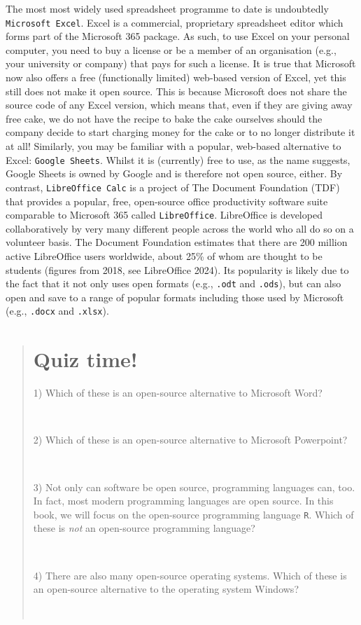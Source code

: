 \documentclass[
  letterpaper,
  DIV=11,
  numbers=noendperiod]{scrreprt}
\begin{document}
The most most widely used spreadsheet programme to date is undoubtedly
\texttt{Microsoft\ Excel}. Excel is a commercial, proprietary
spreadsheet editor which forms part of the Microsoft 365 package. As
such, to use Excel on your personal computer, you need to buy a license
or be a member of an organisation (e.g., your university or company)
that pays for such a license. It is true that Microsoft now also offers
a free (functionally limited) web-based version of Excel, yet this still
does not make it open source. This is because Microsoft does not share
the source code of any Excel version, which means that, even if they are
giving away free cake, we do not have the recipe to bake the cake
ourselves should the company decide to start charging money for the cake
or to no longer distribute it at all! Similarly, you may be familiar
with a popular, web-based alternative to Excel: \texttt{Google\ Sheets}.
Whilst it is (currently) free to use, as the name suggests, Google
Sheets is owned by Google and is therefore not open source, either. By
contrast, \texttt{LibreOffice\ Calc} is a project of The Document
Foundation (TDF) that provides a popular, free, open-source office
productivity software suite comparable to Microsoft 365 called
\texttt{LibreOffice}. LibreOffice is developed collaboratively by very
many different people across the world who all do so on a volunteer
basis. The Document Foundation estimates that there are 200 million
active LibreOffice users worldwide, about 25\% of whom are thought to be
students (figures from 2018, see LibreOffice 2024). Its popularity is
likely due to the fact that it not only uses open formats (e.g.,
\texttt{.odt} and \texttt{.ods}), but can also open and save to a range
of popular formats including those used by Microsoft (e.g.,
\texttt{.docx} and \texttt{.xlsx}).

\begin{quote}
\section*{Quiz time!}\label{quiz-time}


1) Which of these is an open-source alternative to Microsoft Word?

~

2) Which of these is an open-source alternative to Microsoft Powerpoint?

~

3) Not only can software be open source, programming languages can, too.
In fact, most modern programming languages are open source. In this
book, we will focus on the open-source programming language \texttt{R}.
Which of these is \emph{not} an open-source programming language?

~

4) There are also many open-source operating systems. Which of these is
an open-source alternative to the operating system Windows?

~
\end{quote}
\end{document}
